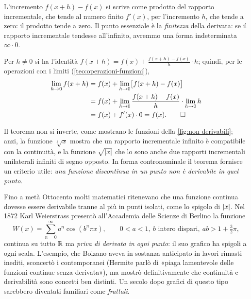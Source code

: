 \begin{schema}
\end{schema}

\begin{strategia}
L'incremento $f(x+h)-f(x)$ si scrive come prodotto del rapporto incrementale, che tende
al numero finito $f'(x)$, per l'incremento $h$, che tende a zero: il prodotto tende a
zero. Il punto essenziale è la \emph{finitezza} della derivata: se il rapporto
incrementale tendesse all'infinito, avremmo una forma indeterminata $\infty\cdot0$.
\end{strategia}

\begin{dimostrazione}
Per $h\neq0$ si ha l'identità
$f(x+h)=f(x)+\frac{f(x+h)-f(x)}{h}\cdot h$; quindi, per le operazioni con i limiti
(\cref{teo:operazioni-funzioni}),
\begin{equation}\label{eq:derivabile-continua}
\begin{split}
  \lim_{h\to0}f(x+h)&=f(x)+\lim_{h\to0}\bigl[f(x+h)-f(x)\bigr]\\
  &=f(x)+\lim_{h\to0}\frac{f(x+h)-f(x)}{h}\cdot\lim_{h\to0}h\\
  &=f(x)+f'(x)\cdot0=f(x). \qedhere
\end{split}
\end{equation}
\end{dimostrazione}

Il teorema non si inverte, come mostrano le funzioni della \cref{fig:non-derivabili};
anzi, la funzione $\sqrt[3]x$ mostra che un rapporto incrementale infinito è compatibile
con la continuità, e la funzione $\sqrt{\lvert x\rvert}$ che lo sono anche due rapporti
incrementali unilaterali infiniti di segno opposto. In forma contronominale il teorema
fornisce un criterio utile: \emph{una funzione discontinua in un punto non è derivabile
in quel punto}.

\begin{notastorica}
Fino a metà Ottocento molti matematici ritenevano che una funzione continua dovesse
essere derivabile tranne al più in punti isolati, come lo spigolo di $\lvert x\rvert$.
Nel 1872 Karl Weierstrass presentò all'Accademia delle Scienze di Berlino la funzione
\[
  W(x)=\sum_{n=0}^{\infty}a^{n}\cos(b^{n}\pi x), \qquad 0<a<1,\ b \text{ intero dispari},\ ab>1+\tfrac32\pi,
\]
continua su tutto $\mathbb{R}$ ma \emph{priva di derivata in ogni punto}: il suo grafico ha
spigoli a ogni scala. L'esempio, che Bolzano aveva in sostanza anticipato in lavori
rimasti inediti, sconcertò i contemporanei (Hermite parlò di «piaga lamentevole delle
funzioni continue senza derivata»), ma mostrò definitivamente che continuità e
derivabilità sono concetti ben distinti. Un secolo dopo grafici di questo tipo sarebbero
diventati familiari come \emph{frattali}.
\end{notastorica}

